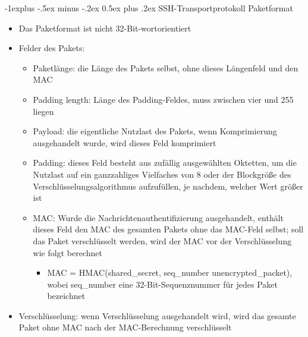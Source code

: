 \documentclass[a4paper]{article}
\makeatletter
\renewcommand{\subsection}{\@startsection{subsection}{2}{0mm}%
 {-1explus -.5ex minus -.2ex}%
 {0.5ex plus .2ex}%
 {\normalfont\normalsize\bfseries}}
\makeatother
\begin{document}
\begin{multicols}{3}
    \subsection{SSH-Transportprotokoll
        Paketformat}


    \begin{itemize}
        \item
              Das Paketformat ist nicht 32-Bit-wortorientiert
        \item
              Felder des Pakets:

              \begin{itemize}
                  \item
                        Paketlänge: die Länge des Pakets selbst, ohne dieses Längenfeld und
                        den MAC
                  \item
                        Padding length: Länge des Padding-Feldes, muss zwischen vier und 255
                        liegen
                  \item
                        Payload: die eigentliche Nutzlast des Pakets, wenn Komprimierung
                        ausgehandelt wurde, wird dieses Feld komprimiert
                  \item
                        Padding: dieses Feld besteht aus zufällig ausgewählten Oktetten, um
                        die Nutzlast auf ein ganzzahliges Vielfaches von 8 oder der
                        Blockgröße des Verschlüsselungsalgorithmus aufzufüllen, je nachdem,
                        welcher Wert größer ist
                  \item
                        MAC: Wurde die Nachrichtenauthentifizierung ausgehandelt, enthält
                        dieses Feld den MAC des gesamten Pakets ohne das MAC-Feld selbst;
                        soll das Paket verschlüsselt werden, wird der MAC vor der
                        Verschlüsselung wie folgt berechnet

                        \begin{itemize}
                            \item
                                  MAC = HMAC(shared\_secret, seq\_number \textbar\textbar{}
                                  unencrypted\_packet), wobei seq\_number eine 32-Bit-Sequenznummer
                                  für jedes Paket bezeichnet
                        \end{itemize}
              \end{itemize}
        \item
              Verschlüsselung: wenn Verschlüsselung ausgehandelt wird, wird das
              gesamte Paket ohne MAC nach der MAC-Berechnung verschlüsselt
    \end{itemize}



\end{multicols}
\end{document}
